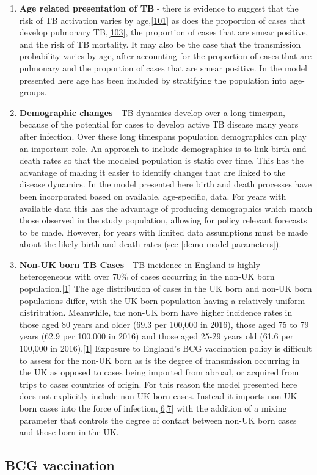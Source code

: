 \documentclass[11pt,twoside]{bristolthesis}
\begin{document}
\begin{enumerate}
  \item
    \textbf{Age related presentation of TB} - there is evidence to suggest that the risk of TB activation varies by age,{[}\protect\hyperlink{ref-Ragonnet2017}{101}{]} as does the proportion of cases that develop pulmonary TB,{[}\protect\hyperlink{ref-Lefebvre2017}{103}{]}, the proportion of cases that are smear positive, and the risk of TB mortality. It may also be the case that the transmission probability varies by age, after accounting for the proportion of cases that are pulmonary and the proportion of cases that are smear positive. In the model presented here age has been included by stratifying the population into age-groups.
  \item
    \textbf{Demographic changes} - TB dynamics develop over a long timespan, because of the potential for cases to develop active TB disease many years after infection. Over these long timespans population demographics can play an important role. An approach to include demographics is to link birth and death rates so that the modeled population is static over time. This has the advantage of making it easier to identify changes that are linked to the disease dynamics. In the model presented here birth and death processes have been incorporated based on available, age-specific, data. For years with available data this has the advantage of producing demographics which match those observed in the study population, allowing for policy relevant forecasts to be made. However, for years with limited data assumptions must be made about the likely birth and death rates (see \ref{demo-model-parameters}).
  \item
    \textbf{Non-UK born TB Cases} - TB incidence in England is highly heterogeneous with over 70\% of cases occurring in the non-UK born population.{[}\protect\hyperlink{ref-PHE2017}{1}{]} The age distribution of cases in the UK born and non-UK born populations differ, with the UK born population having a relatively uniform distribution. Meanwhile, the non-UK born have higher incidence rates in those aged 80 years and older (69.3 per 100,000 in 2016), those aged 75 to 79 years (62.9 per 100,000 in 2016) and those aged 25-29 years old (61.6 per 100,000 in 2016).{[}\protect\hyperlink{ref-PHE2017}{1}{]} Exposure to England's BCG vaccination policy is difficult to assess for the non-UK born as is the degree of transmission occurring in the UK as opposed to cases being imported from abroad, or acquired from trips to cases countries of origin. For this reason the model presented here does not explicitly include non-UK born cases. Instead it imports non-UK born cases into the force of infection,{[}\protect\hyperlink{ref-Anderson1991}{6},\protect\hyperlink{ref-Keeling2007}{7}{]} with the addition of a mixing parameter that controls the degree of contact between non-UK born cases and those born in the UK.
  \end{enumerate}
  \hypertarget{bcg-vaccination}{%
  \subsection{BCG vaccination}\label{bcg-vaccination}}
  
\end{document}
